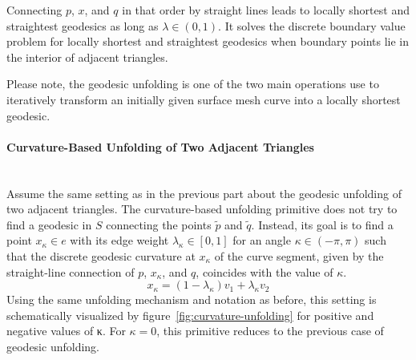 \documentclass{stdlocal}
\begin{document}

  \begin{lemma}
    Connecting $p$, $x$, and $q$ in that order by straight lines leads to locally shortest and straightest geodesics as long as $λ\in (0,1)$.
    It solves the discrete boundary value problem for locally shortest and straightest geodesics when boundary points lie in the interior of adjacent triangles.
  \end{lemma}
  \noindent
  Please note, the geodesic unfolding is one of the two main operations \textcite{martinez2005} use to iteratively transform an initially given surface mesh curve into a locally shortest geodesic.


  \paragraph{Curvature-Based Unfolding of Two Adjacent Triangles}\hfill\\
    Assume the same setting as in the previous part about the geodesic unfolding of two adjacent triangles.
    The curvature-based unfolding primitive does not try to find a geodesic in $S$ connecting the points $\tilde{p}$ and $\tilde{q}$.
    Instead, its goal is to find a point $x_κ \in e$ with its edge weight $λ_κ\in[0,1]$ for an angle $κ\in(-π,π)$ such that the discrete geodesic curvature at $x_κ$ of the curve segment, given by the straight-line connection of $p$, $x_κ$, and $q$, coincides with the value of $κ$.
    \[
      x_κ = (1-λ_κ)v_1 + λ_κ v_2
    \]
    Using the same unfolding mechanism and notation as before, this setting is schematically visualized by figure~\ref{fig:curvature-unfolding} for positive and negative values of κ.
    For $κ=0$, this primitive reduces to the previous case of geodesic unfolding.
\end{document}
